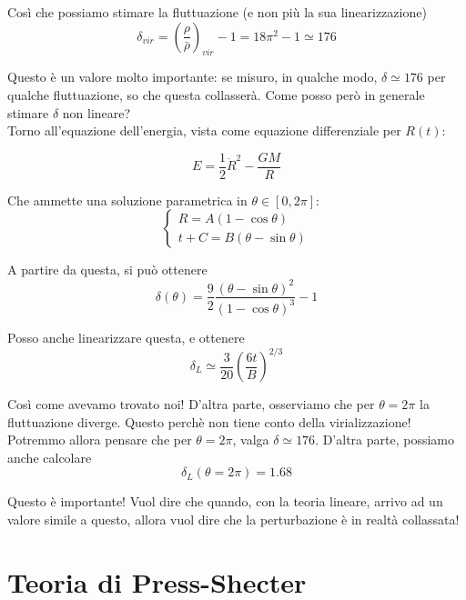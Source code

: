 \documentclass{report}
\begin{document}
Così che possiamo stimare la fluttuazione (e non più la sua linearizzazione)
\begin{equation}
    \delta_{vir} = \left(\frac{\rho}{\bar{\rho}}\right)_{vir} -1 = 18\pi^2 - 1 \simeq 176
\end{equation}

Questo è un valore molto importante: se misuro, in qualche modo, $\delta \simeq 176$ per qualche fluttuazione, so che questa collasserà. Come posso però in generale stimare $\delta$ non lineare? \\

Torno all'equazione dell'energia, vista come equazione differenziale per $R(t)$: 

\begin{equation}
    E = \frac{1}{2}\dot{R}^2 - \frac{GM}{R}
\end{equation}

Che ammette una soluzione parametrica in $\theta \in [0, 2\pi]$: 
\[\begin{cases}
    R = A(1-\cos\theta) \\ t + C = B(\theta - \sin\theta)
\end{cases}\]

A partire da questa, si può ottenere
\begin{equation}
    \delta(\theta) = \frac{9}{2}\frac{(\theta - \sin\theta)^2}{(1 - \cos\theta)^3}-1
\end{equation}

Posso anche linearizzare questa, e ottenere 
\begin{equation}
    \delta_L \simeq \frac{3}{20}\left(\frac{6t}{B} \right)^{2/3}
\end{equation}

Così come avevamo trovato noi! D'altra parte, osserviamo che per $\theta = 2\pi$ la fluttuazione diverge. Questo perchè non tiene conto della virializzazione! Potremmo allora pensare che per $\theta = 2\pi$, valga $\delta \simeq 176$. D'altra parte, possiamo anche calcolare 
\begin{equation}
    \delta_L (\theta=2\pi) = 1.68
\end{equation}

Questo è importante! Vuol dire che quando, con la teoria lineare, arrivo ad un valore simile a questo, allora vuol dire che la perturbazione è in realtà collassata! 

\section{Teoria di Press-Shecter}
\end{document}

